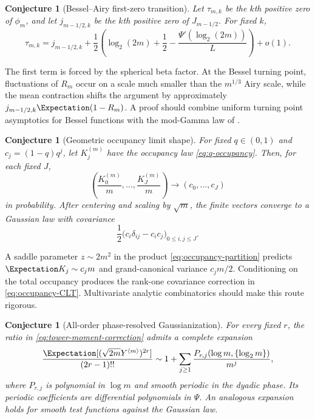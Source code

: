 \documentclass[11pt,oneside]{article}
\newtheorem{conjecture}[theorem]{Conjecture}
\theoremstyle{definition}
\theoremstyle{remark}
\newcommand{\Tower}[1]{Y^{\langle #1\rangle}}
\begin{document}
\begin{conjecture}[Bessel--Airy first-zero transition]
\label{conj:Bessel-Airy}
Let $\tau_{m,k}$ be the $k$th positive zero of $\phi_m$, and let
$j_{m-1/2,k}$ be the $k$th positive zero of $J_{m-1/2}$.  For fixed $k$,
\begin{equation}
 \tau_{m,k}
 =j_{m-1/2,k}
  +\frac12\left(
      \log_2(2m)+\frac12-\frac{\Psi'(\log_2(2m))}{L}
    \right)
  +o(1).                                            \label{eq:Bessel-Airy}
\end{equation}
\end{conjecture}

The first term is forced by the spherical beta factor.  At the Bessel turning
point, fluctuations of $R_m$ occur on a scale much smaller than the
$m^{1/3}$ Airy scale, while the mean contraction shifts the argument by
approximately $j_{m-1/2,k}\Expectation(1-R_m)$.  A proof should combine uniform turning
point asymptotics for Bessel functions with the mod-Gamma law of
.

\begin{conjecture}[Geometric occupancy limit shape]
\label{conj:occupancy-shape}
For fixed $q\in(0,1)$ and $c_j=(1-q)q^j$, let $K_j^{(m)}$ have the occupancy law
\eqref{eq:q-occupancy}.  Then, for each fixed $J$,
\begin{equation}
 \left(\frac{K_0^{(m)}}m,\ldots,\frac{K_J^{(m)}}m\right)
 \longrightarrow(c_0,\ldots,c_J)                  \label{eq:occupancy-LLN}
\end{equation}
in probability.  After centering and scaling by $\sqrt m$, the finite vectors
converge to a Gaussian law with covariance
\begin{equation}
 \frac12\bigl(c_i\delta_{ij}-c_ic_j\bigr)_{0\le i,j\le J}.      \label{eq:occupancy-CLT}
\end{equation}
\end{conjecture}

A saddle parameter $z\sim2m^2$ in the product
\eqref{eq:occupancy-partition} predicts
\(
 \Expectation K_j\sim c_jm
\)
and grand-canonical variance $c_jm/2$.  Conditioning on the total occupancy
produces the rank-one covariance correction in \eqref{eq:occupancy-CLT}.
Multivariate analytic combinatorics should make this route rigorous.

\begin{conjecture}[All-order phase-resolved Gaussianization]
\label{conj:all-order-Gaussian}
For every fixed $r$, the ratio in
\eqref{eq:tower-moment-correction} admits a complete expansion
\begin{equation}
 \frac{\Expectation[(\sqrt{2m}\Tower{m})^{2r}]}{(2r-1)!!}
 \sim1+\sum_{j\ge1}\frac{P_{r,j}(\log m,\{\log_2m\})}{m^j},    \label{eq:all-order-Gaussian}
\end{equation}
where $P_{r,j}$ is polynomial in $\log m$ and smooth periodic in the dyadic
phase.  Its periodic coefficients are differential polynomials in $\Psi$.
An analogous expansion holds for smooth test functions against the Gaussian
law.
\end{conjecture}
\end{document}
